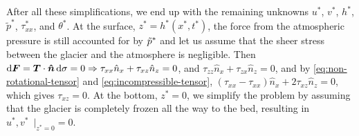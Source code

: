 After all these simplifications, we end up with the remaining unknowns $u^*$, $v^*$, $h^*$, $\tilde{p}^*$, $\tau_{xx}^*$, and $\theta^*$. At the surface, $z^* = h^*(x^*,t^*)$, the force from the atmospheric pressure is still accounted for by $\Tilde{p}^*$ and let us assume that the sheer stress between the glacier and the atmosphere is negligible. Then $\dif{\boldsymbol{F}} = \boldsymbol{T} \cdot \boldsymbol{\hat{n}} \dif{\sigma} = 0 \Rightarrow \tau_{xx}\hat{n}_x + \tau_{xz}\hat{n}_z = 0 $, and $\tau_{zz}\hat{n}_x + \tau_{zx}\hat{n}_z = 0$, and by \eqref{eq:non-rotational-tensor} and \eqref{eq:incompressible-tensor}, $(\tau_{xx} - \tau_{xx})\hat{n}_x + 2\tau_{xz}\hat{n}_z = 0$, which gives $ \tau_{xz} = 0 $. At the bottom, $z^* = 0$, we simplify the problem by assuming that the glacier is completely frozen all the way to the bed, resulting in $u^*, v^*\enspace|_{z^*=0}= 0$. 
%

